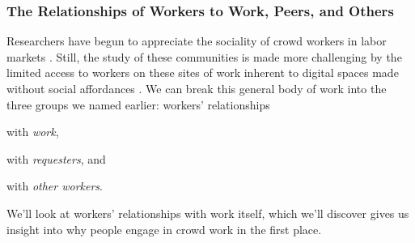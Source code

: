 \documentclass[trackingWork]{subfiles}
\begin{document}
\subsubsection[What will work and the place of work look like for workers]{The Relationships of Workers to Work, Peers, and Others}
\label{sec:relationships}

\subsubsubsection{\crowdworkpers}
Researchers have begun to appreciate
the sociality of crowd workers in labor markets
\cite{crowdcollab}.
Still, the study of these communities is made more challenging by
the limited access to workers on these sites of work
inherent to digital spaces made without social affordances
\cite{miller2011understanding}.
We can break this general body of work into the three groups we named earlier:
workers' relationships
\begin{inlinelist}
\item with \textit{work}, %
\item with \textit{requesters}, and
\item with \textit{other workers}.
\end{inlinelist}
We'll look at workers' relationships with work itself, which we'll discover
gives us insight into why people engage in crowd work in the first place.
\end{document}
